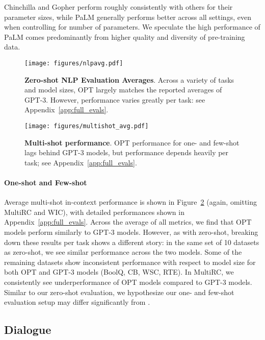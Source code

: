 \documentclass[11pt]{article}
\begin{document}
Chinchilla \cite{chinchilla2022} and Gopher \cite{gopher2022} perform roughly consistently with others for their parameter sizes, while PaLM \cite{palm2022} generally performs better across all settings, even when controlling for number of parameters. We speculate the high performance of PaLM comes predominantly from higher quality and diversity of pre-training data.


\begin{figure}
    \centering
    \texttt{[image: figures/nlpavg.pdf]}
    \caption{{\bf Zero-shot NLP Evaluation Averages}. Across a variety of tasks and model sizes, OPT largely matches the reported averages of GPT-3. However, performance varies greatly per task: see Appendix~\ref{app:full_evals}.}
    \label{fig:zeroshot}
\end{figure}

\begin{figure}[t]
    \centering
    \texttt{[image: figures/multishot\_avg.pdf]}
    \caption{\textbf{Multi-shot performance}. OPT performance for one- and few-shot lags behind GPT-3 models, but performance depends heavily per task; see Appendix~\ref{app:full_evals}.}
    \label{fig:multishot}
\end{figure}

\paragraph{One-shot and Few-shot} Average multi-shot in-context performance is shown in Figure~\ref{fig:multishot} (again, omitting MultiRC and WIC), with detailed performances shown in Appendix~\ref{app:full_evals}. Across the average of all metrics, we find that OPT models perform similarly to GPT-3 models. However, as with zero-shot, breaking down these results per task shows a different story: in the same set of 10 datasets as zero-shot, we see similar performance across the two models. Some of the remaining datasets show inconsistent performance with respect to model size for both OPT and GPT-3 models (BoolQ, CB, WSC, RTE). In MultiRC, we consistently see underperformance of OPT models compared to GPT-3 models. Similar to our zero-shot evaluation, we hypothesize our one- and few-shot evaluation setup may differ significantly from \citet{brown2020gpt3}.

\subsection{Dialogue}
\label{sec:dialogue}
\end{document}
